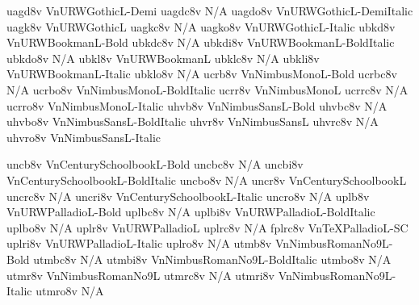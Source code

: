 \documentclass[test]{vnsample}
\begin{document}
\begin{shortsample}
  {uagd8v}  {VnURWGothicL-Demi}
 {uagdc8v} {N/A}
 {uagdo8v} {VnURWGothicL-DemiItalic}
   {uagk8v}  {VnURWGothicL}
  {uagkc8v} {N/A}
  {uagko8v} {VnURWGothicL-Italic}
%
  {ubkd8v}  {VnURWBookmanL-Bold}
 {ubkdc8v} {N/A}
 {ubkdi8v} {VnURWBookmanL-BoldItalic}
 {ubkdo8v} {N/A}
   {ubkl8v}  {VnURWBookmanL}
  {ubklc8v} {N/A}
  {ubkli8v} {VnURWBookmanL-Italic}
  {ubklo8v} {N/A}
%
   {ucrb8v}  {VnNimbusMonoL-Bold}
  {ucrbc8v} {N/A}
  {ucrbo8v} {VnNimbusMonoL-BoldItalic}
   {ucrr8v}  {VnNimbusMonoL}
  {ucrrc8v} {N/A}
  {ucrro8v} {VnNimbusMonoL-Italic}
%
   {uhvb8v}  {VnNimbusSansL-Bold}
  {uhvbc8v} {N/A}
  {uhvbo8v} {VnNimbusSansL-BoldItalic}
   {uhvr8v}  {VnNimbusSansL}
  {uhvrc8v} {N/A}
  {uhvro8v} {VnNimbusSansL-Italic}
\end{shortsample}
\clearpage
\begin{shortsample}
   {uncb8v}  {VnCenturySchoolbookL-Bold}
  {uncbc8v} {N/A}
  {uncbi8v} {VnCenturySchoolbookL-BoldItalic}
  {uncbo8v} {N/A}
   {uncr8v}  {VnCenturySchoolbookL}
  {uncrc8v} {N/A}
  {uncri8v} {VnCenturySchoolbookL-Italic}
  {uncro8v} {N/A}
%
   {uplb8v}  {VnURWPalladioL-Bold}
  {uplbc8v} {N/A}
  {uplbi8v} {VnURWPalladioL-BoldItalic}
  {uplbo8v} {N/A}
   {uplr8v}  {VnURWPalladioL}
  {uplrc8v} {N/A}
  {fplrc8v} {VnTeXPalladioL-SC}
  {uplri8v} {VnURWPalladioL-Italic}
  {uplro8v} {N/A}
%
   {utmb8v}  {VnNimbusRomanNo9L-Bold}
  {utmbc8v} {N/A}
  {utmbi8v} {VnNimbusRomanNo9L-BoldItalic}
  {utmbo8v} {N/A}
   {utmr8v}  {VnNimbusRomanNo9L}
  {utmrc8v} {N/A}
  {utmri8v} {VnNimbusRomanNo9L-Italic}
  {utmro8v} {N/A}
\end{shortsample}
\end{document}
